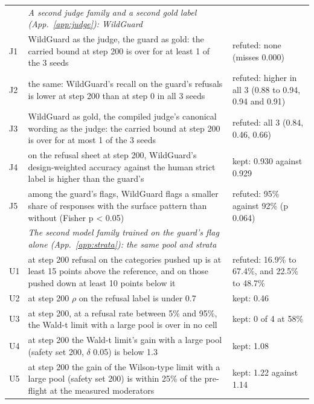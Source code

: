 \begin{tabular}{@{}l p{7.4cm} p{7.4cm}@{}}
 & \emph{A second judge family and a second gold label (App.~\ref{app:judge}): WildGuard} &  \\
J1 & WildGuard as the judge, the guard as gold: the carried bound at step 200 is over for at least 1 of the 3 seeds & refuted: none (misses 0.000) \\
J2 & the same: WildGuard's recall on the guard's refusals is lower at step 200 than at step 0 in all 3 seeds & refuted: higher in all 3 (0.88 to 0.94, 0.94 and 0.91) \\
J3 & WildGuard as gold, the compiled judge's canonical wording as the judge: the carried bound at step 200 is over for at most 1 of the 3 seeds & refuted: all 3 (0.84, 0.46, 0.66) \\
J4 & on the refusal sheet at step 200, WildGuard's design-weighted accuracy against the human strict label is higher than the guard's & kept: 0.930 against 0.929 \\
J5 & among the guard's flags, WildGuard flags a smaller share of responses with the surface pattern than without (Fisher p < 0.05) & refuted: 95\% against 92\% (p 0.064) \\
 & \emph{The second model family trained on the guard's flag alone (App.~\ref{app:strata}): the same pool and strata} &  \\
U1 & at step 200 refusal on the categories pushed up is at least 15 points above the reference, and on those pushed down at least 10 points below it & refuted: 16.9\% to 67.4\%, and 22.5\% to 48.7\% \\
U2 & at step 200 $\rho$ on the refusal label is under 0.7 & kept: 0.46 \\
U3 & at step 200, at a refusal rate between 5\% and 95\%, the Wald-t limit with a large pool is over in no cell & kept: 0 of 4 at 58\% \\
U4 & at step 200 the Wald-t limit's gain with a large pool (safety set 200, $\delta$ 0.05) is below 1.3 & kept: 1.08 \\
U5 & at step 200 the gain of the Wilson-type limit with a large pool (safety set 200) is within 25\% of the pre-flight at the measured moderators & kept: 1.22 against 1.14 \\
\bottomrule
\end{tabular}
